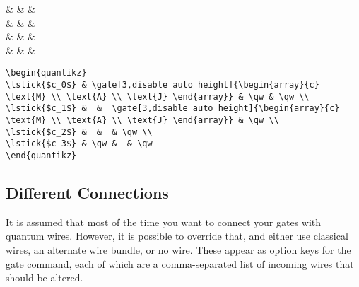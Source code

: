 \documentclass[aps,pra,10pt,nofootinbib]{revtex4}
\begin{document}
\begin{Code}
\begin{center}
\begin{quantikz}
 &  & \qw & \qw \\
 &  &   & \qw \\
 &  &  & \qw \\
 & \qw &  & \qw
\end{quantikz}
\end{center}
\tcblower
\begin{lstlisting}
\begin{quantikz}
\lstick{$c_0$} & \gate[3,disable auto height]{\begin{array}{c} \text{M} \\ \text{A} \\ \text{J} \end{array}} & \qw & \qw \\
\lstick{$c_1$} &  &  \gate[3,disable auto height]{\begin{array}{c} \text{M} \\ \text{A} \\ \text{J} \end{array}} & \qw \\
\lstick{$c_2$} &  &  & \qw \\
\lstick{$c_3$} & \qw &  & \qw
\end{quantikz}
\end{lstlisting}
\end{Code}

\subsection{Different Connections}\label{sec:wires}

It is assumed that most of the time you want to connect your gates with quantum wires. However, it is possible to override that, and either use classical wires, an alternate wire bundle, or no wire. These appear as option keys for the gate command, each of which are a comma-separated list of incoming wires that should be altered.
\end{document}
